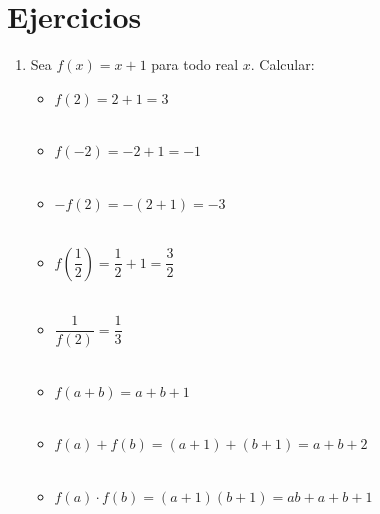\setcounter{section}{4}
\section{Ejercicios}
    \begin{enumerate}[ \bfseries 1.]
        \item Sea $f(x)=x+1$ para todo real $x$. Calcular:
            \begin{itemize}
                \item $f(2) = 2+1 = 3$\\\\
                \item $f(-2) = -2 +1 = -1$\\\\
                \item $-f(2) = -(2+1)=-3$\\\\
                \item $f \left( \dfrac{1}{2} \right) = \dfrac{1}{2} + 1 = \dfrac{3}{2}$\\\\
                \item $\dfrac{1}{f(2)}= \dfrac{1}{3}$\\\\
                \item $f(a+b) = a+b+1$\\\\
                \item $f(a)+f(b)= (a+1) + (b+1) = a+b+2$\\\\
                \item $f(a) \cdot f(b) = (a+1)(b+1) = ab + a + b + 1$\\\\
            \end{itemize}


\end{enumerate}
